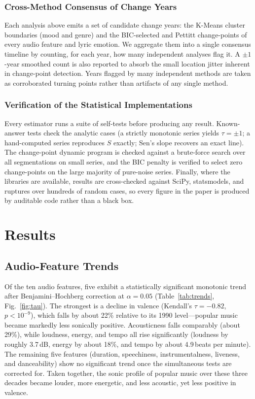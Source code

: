 \documentclass[conference]{IEEEtran}
\begin{document}
\subsubsection{Cross-Method Consensus of Change Years}
\label{sec:consensus}
Each analysis above emits a set of candidate change years: the K-Means cluster
boundaries (mood and genre) and the BIC-selected and Pettitt change-points of
every audio feature and lyric emotion. We aggregate them into a single consensus
timeline by counting, for each year, how many independent analyses flag it. A
$\pm 1$-year smoothed count is also reported to absorb the small location jitter
inherent in change-point detection. Years flagged by many independent methods
are taken as corroborated turning points rather than artifacts of any single
method.

\subsubsection{Verification of the Statistical Implementations}
\label{sec:verification}
Every estimator runs a suite of self-tests before producing any result.
Known-answer tests check the analytic cases (a strictly monotonic series yields
$\tau = \pm 1$; a hand-computed series reproduces $S$ exactly; Sen's slope
recovers an exact line). The change-point dynamic program is checked against a
brute-force search over all segmentations on small series, and the BIC penalty
is verified to select zero change-points on the large majority of pure-noise
series. Finally, where the libraries are available, results are cross-checked
against SciPy, statsmodels, and ruptures over hundreds of random cases, so every
figure in the paper is produced by auditable code rather than a black box.

\section{Results}

\subsection{Audio-Feature Trends}
Of the ten audio features, five exhibit a statistically significant monotonic
trend after Benjamini--Hochberg correction at $\alpha = 0.05$
(Table~\ref{tab:trends}, Fig.~\ref{fig:tau}). The strongest is a decline in
valence (Kendall's $\tau = -0.82$, $p < 10^{-9}$), which falls by about 22\%
relative to its 1990 level---popular music became markedly less sonically
positive. Acousticness falls comparably (about 29\%), while loudness, energy,
and tempo all rise significantly (loudness by roughly 3.7\,dB, energy by about
18\%, and tempo by about 4.9\,beats per minute). The remaining five features
(duration, speechiness, instrumentalness, liveness, and danceability) show no
significant trend once the simultaneous tests are corrected for. Taken together,
the sonic profile of popular music over these three decades became louder, more
energetic, and less acoustic, yet less positive in valence.
\end{document}
